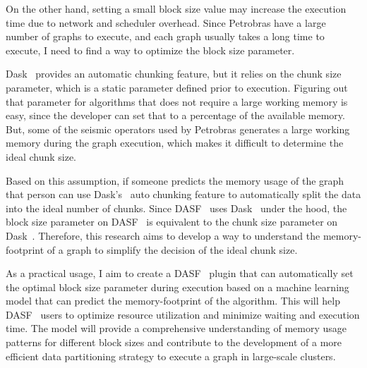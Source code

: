 On the other hand, setting a small block size value may increase the execution time due to network and scheduler overhead.
Since Petrobras have a large number of graphs to execute, and each graph usually takes a long time to execute, I need to find a way to optimize the block size parameter.

Dask~\cite{dask} provides an automatic chunking feature, but it relies on the chunk size parameter, which is a static parameter defined prior to execution.
Figuring out that parameter for algorithms that does not require a large working memory is easy, since the developer can set that to a percentage of the available memory.
But, some of the seismic operators used by Petrobras generates a large working memory during the graph execution, which makes it difficult to determine the ideal chunk size.

Based on this assumption, if someone predicts the memory usage of the graph that person can use Dask's~\cite{dask} auto chunking feature to automatically split the data into the ideal number of chunks.
Since \ac{DASF}~\cite{dasf} uses Dask~\cite{dask} under the hood, the block size parameter on \ac{DASF}~\cite{dasf} is equivalent to the chunk size parameter on Dask~\cite{dask}.
Therefore, this research aims to develop a way to understand the memory-footprint of a graph to simplify the decision of the ideal chunk size.

As a practical usage, I aim to create a \ac{DASF}~\cite{dasf} plugin that can automatically set the optimal block size parameter during execution based on a machine learning model that can predict the memory-footprint of the algorithm.
This will help \ac{DASF}~\cite{dasf} users to optimize resource utilization and minimize waiting and execution time.
The model will provide a comprehensive understanding of memory usage patterns for different block sizes and contribute to the development of a more efficient data partitioning strategy to execute a graph in large-scale clusters.
